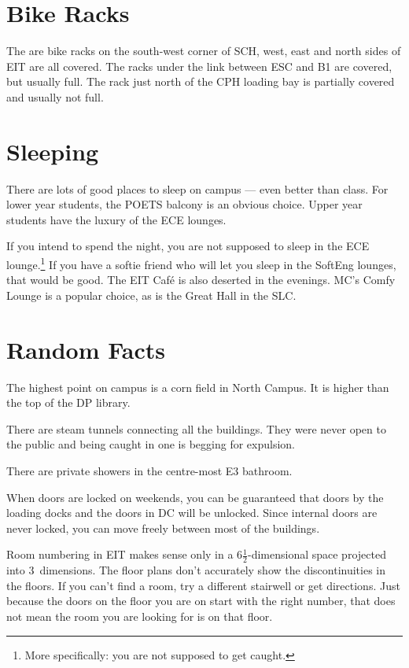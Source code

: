 \documentclass{book}
\begin{document}
\section{Bike Racks}
The are bike racks on the south-west corner of SCH, west, east and north sides of EIT are all covered. The racks under the link between ESC and B1 are covered, but usually full. The rack just north of the CPH loading bay is partially covered and usually not full.

\section{Sleeping}
There are lots of good places to sleep on campus --- even better than class. For lower year students, the POETS balcony is an obvious choice. Upper year students have the luxury of the ECE lounges.

If you intend to spend the night, you are not supposed to sleep in the ECE lounge.\footnote{More specifically: you are not supposed to get caught.} If you have a softie friend who will let you sleep in the SoftEng lounges, that would be good. The EIT Caf\'e is also deserted in the evenings. MC's Comfy Lounge is a popular choice, as is the Great Hall in the SLC.

\section{Random Facts}
The highest point on campus is a corn field in North Campus. It is higher than the top of the DP library.

There are steam tunnels connecting all the buildings. They were never open to the public and being caught in one is begging for expulsion.

There are private showers in the centre-most E3 bathroom.

When doors are locked on weekends, you can be guaranteed that doors by the loading docks and the doors in DC will be unlocked. Since internal doors are never locked, you can move freely between most of the buildings.

Room numbering in EIT makes sense only in a $6\frac{1}{2}$-dimensional space projected into 3~dimensions. The floor plans don't accurately show the discontinuities in the floors. If you can't find a room, try a different stairwell or get directions. Just because the doors on the floor you are on start with the right number, that does not mean the room you are looking for is on that floor.
\end{document}
